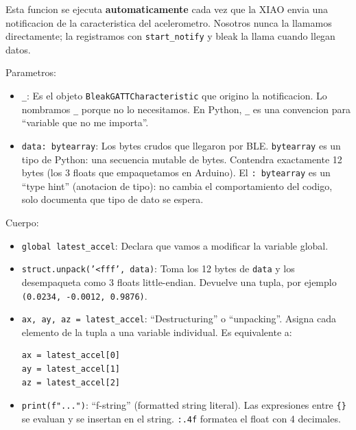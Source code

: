 \documentclass[11pt,a4paper]{article}
\begin{document}
Esta funcion se ejecuta \textbf{automaticamente} cada vez que la
XIAO envia una notificacion de la caracteristica del acelerometro.
Nosotros nunca la llamamos directamente; la registramos con
\texttt{start\_notify} y bleak la llama cuando llegan datos.

Parametros:
\begin{itemize}
    \item \texttt{\_}: Es el objeto
          \texttt{BleakGATTCharacteristic} que origino la
          notificacion. Lo nombramos \texttt{\_} porque no lo
          necesitamos. En Python, \texttt{\_} es una convencion
          para ``variable que no me importa''.

    \item \texttt{data: bytearray}: Los bytes crudos que llegaron
          por BLE. \texttt{bytearray} es un tipo de Python: una
          secuencia mutable de bytes. Contendra exactamente 12
          bytes (los 3 floats que empaquetamos en Arduino).
          El \texttt{: bytearray} es un ``type hint'' (anotacion
          de tipo): no cambia el comportamiento del codigo, solo
          documenta que tipo de dato se espera.
\end{itemize}

Cuerpo:
\begin{itemize}
    \item \texttt{global latest\_accel}: Declara que vamos a
          modificar la variable global.

    \item \texttt{struct.unpack('<fff', data)}: Toma los 12 bytes
          de \texttt{data} y los desempaqueta como 3 floats
          little-endian. Devuelve una tupla, por ejemplo
          \texttt{(0.0234, -0.0012, 0.9876)}.

    \item \texttt{ax, ay, az = latest\_accel}: ``Destructuring'' o
          ``unpacking''. Asigna cada elemento de la tupla a una
          variable individual. Es equivalente a:
\begin{lstlisting}[style=python]
ax = latest_accel[0]
ay = latest_accel[1]
az = latest_accel[2]
\end{lstlisting}

    \item \texttt{print(f"...")}: ``f-string'' (formatted string
          literal). Las expresiones entre \texttt{\{\}} se evaluan
          y se insertan en el string. \texttt{:.4f} formatea el
          float con 4 decimales.
\end{itemize}
\end{document}

